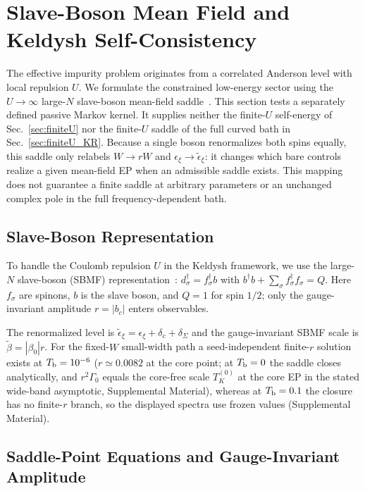 \documentclass[%
  aps,physrev,onecolumn,10pt,amsmath,amssymb,superscriptaddress,longbibliography,floatfix
]{revtex4-2}
\newcommand{\teps}{\tilde{\epsilon}_{\xi}}
\newcommand{\tb}{\tilde{\beta}}          %
\newcommand{\gb}{\beta_0}               %
\newcommand{\dSig}{\delta_{\Sigma}}          %
\begin{document}
\section{Slave-Boson Mean Field and Keldysh Self-Consistency}
\label{sec:mf}

The effective impurity problem originates from a correlated Anderson
level with local repulsion $U$.  We formulate the constrained low-energy
sector using the $U\to\infty$ large-$N$ slave-boson mean-field
saddle~\cite{coleman1984mixed,read1983solution,SBkeld}.
This section tests a separately defined passive Markov kernel.  It supplies
neither the finite-$U$ self-energy of Sec.~\ref{sec:finiteU} nor the
finite-$U$ saddle of the full curved bath in Sec.~\ref{sec:finiteU_KR}.
Because a single boson renormalizes both spins equally, this saddle only
relabels $W\to rW$ and $\epsilon_\xi\to\teps$: it changes which bare controls
realize a given mean-field EP when an admissible saddle exists.  This mapping does not guarantee a finite saddle at arbitrary parameters or an unchanged complex pole in the full frequency-dependent bath.

\subsection{Slave-Boson Representation}

To handle the Coulomb repulsion $U$ in the Keldysh framework,
we use the large-$N$ slave-boson (SBMF)
representation~\cite{coleman1984mixed,read1983solution,SBkeld}:
$d^\dagger_\sigma=f^\dagger_\sigma b$ with
$b^\dagger b+\sum_\sigma f^\dagger_\sigma f_\sigma=Q$.
Here $f_\sigma$ are spinons, $b$ is the slave boson, and $Q=1$ for spin $1/2$; only the gauge-invariant amplitude $r=|b_c|$ enters observables.

The renormalized level is $\teps=\epsilon_\xi+\delta_c+\dSig$ and the
gauge-invariant SBMF scale is $\tb=|\gb|r$.
For the fixed-$W$ small-width path a seed-independent finite-$r$ solution exists at $T_{\rm b}=10^{-6}$ ($r\simeq0.0082$ at the core point; at $T_{\rm b}=0$ the saddle closes
analytically, and $r^2\Gamma_0$ equals the core-free scale $T_K^{(0)}$
at the core EP in the stated wide-band asymptotic, Supplemental Material), whereas at $T_{\rm b}=0.1$ the closure has no finite-$r$ branch, so the displayed spectra use frozen values (Supplemental Material).

\subsection{Saddle-Point Equations and Gauge-Invariant Amplitude}
\end{document}
